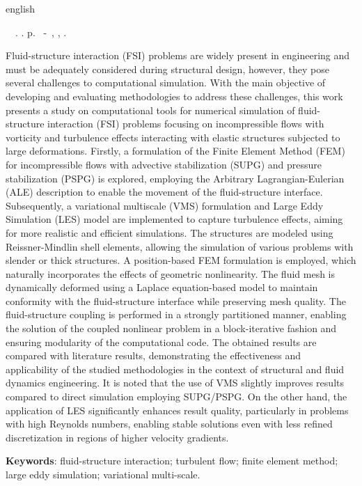 \begin{resumo}[Abstract]
	\begin{otherlanguage*}{english}
		\begin{flushleft}
			\setlength{\absparsep}{0pt} %
			\SingleSpacing  		\imprimirautorabr~~\textbf{\imprimirtitleabstract}.	\imprimirdata.  \pageref{LastPage} p.
			\imprimirtipotrabalhoabs~-~\imprimirinstituicao, \imprimirlocal, 	\imprimirdata.
		\end{flushleft}
		\OnehalfSpacing

		Fluid-structure interaction (FSI) problems are widely present in engineering and must be adequately considered during structural design, however, they pose several challenges to computational simulation. With the main objective of developing and evaluating methodologies to address these challenges, this work presents a study on computational tools for numerical simulation of fluid-structure interaction (FSI) problems focusing on incompressible flows with vorticity and turbulence effects interacting with elastic structures subjected to large deformations. Firstly, a formulation of the Finite Element Method (FEM) for incompressible flows with advective stabilization (SUPG) and pressure stabilization (PSPG) is explored, employing the Arbitrary Lagrangian-Eulerian (ALE) description to enable the movement of the fluid-structure interface. Subsequently, a variational multiscale (VMS) formulation and Large Eddy Simulation (LES) model are implemented to capture turbulence effects, aiming for more realistic and efficient simulations. The structures are modeled using Reissner-Mindlin shell elements, allowing the simulation of various problems with slender or thick structures. A position-based FEM formulation is employed, which naturally incorporates the effects of geometric nonlinearity. The fluid mesh is dynamically deformed using a Laplace equation-based model to maintain conformity with the fluid-structure interface while preserving mesh quality. The fluid-structure coupling is performed in a strongly partitioned manner, enabling the solution of the coupled nonlinear problem in a block-iterative fashion and ensuring modularity of the computational code. The obtained results are compared with literature results, demonstrating the effectiveness and applicability of the studied methodologies in the context of structural and fluid dynamics engineering. It is noted that the use of VMS slightly improves results compared to direct simulation employing SUPG/PSPG. On the other hand, the application of LES significantly enhances result quality, particularly in problems with high Reynolds numbers, enabling stable solutions even with less refined discretization in regions of higher velocity gradients.		\vspace{\onelineskip}

		\noindent
		\textbf{Keywords}: fluid-structure interaction; turbulent flow; finite element method; large eddy simulation; variational multi-scale.
	\end{otherlanguage*}
\end{resumo}
